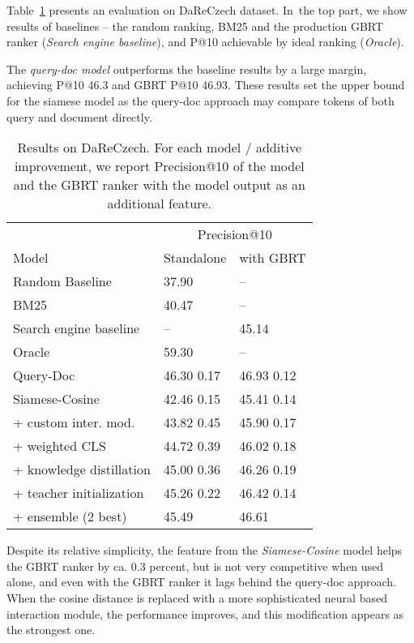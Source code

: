 \documentclass[letterpaper]{article} \usepackage{aaai22 }  \usepackage{times}  \usepackage{helvet}  \usepackage{courier}  \usepackage[hyphens]{url}  \usepackage{graphicx} \usepackage{amsmath,amsfonts,amssymb, mathabx,bm,bbm}
\begin{document}
Table~\ref{table:results_main} presents an evaluation on DaReCzech dataset. In~the top part, we show results of baselines – the random ranking, BM25 and the production GBRT ranker (\textit{Search engine baseline}), and P@10 achievable by ideal ranking (\textit{Oracle}).

The \textit{query-doc model} outperforms the baseline results by a large margin, achieving P@10 46.3 and GBRT P@10 46.93. 
These results set the upper bound for the siamese model as the query-doc approach may compare tokens of both query and document directly.

\begin{table}[!htb]
    \centering\footnotesize
    \begin{tabular}{lll}\toprule
    & \multicolumn{2}{c}{Precision@10}\\
    Model & Standalone & with GBRT \\\midrule
    Random Baseline & 37.90 & -- \\
    BM25 & 40.47 & -- \\
    Search engine baseline & -- & 45.14 \\
    Oracle & 59.30 & -- \\\midrule
    
    Query-Doc & 46.30  0.17 & 46.93  0.12 \\\midrule
    
    Siamese-Cosine & 42.46  0.15	& 45.41  0.14 \\
     + custom inter. mod. & 43.82  0.45 & 45.90  0.17 \\
     + weighted CLS & 44.72  0.39	& 46.02  0.18 \\
     + knowledge distillation & 45.00  0.36 & 46.26  0.19\\
     + teacher initialization & 45.26  0.22 & 46.42  0.14\\
     + ensemble (2 best) & 45.49 & 46.61  \\\bottomrule
    \end{tabular}
    \caption{Results on DaReCzech. For each model / additive improvement, we report Precision@10 of the model and the GBRT ranker with the model output as an additional feature.}
    \label{table:results_main}
\end{table}

Despite its relative simplicity, the feature from the \textit{Siamese-Cosine} model helps the GBRT ranker by ca. 0.3 percent, but is not very competitive when used alone, and even with the GBRT ranker it lags behind the query-doc approach. When the cosine distance is replaced with a more sophisticated neural based interaction module, the performance improves, and this modification appears as the strongest one.
\end{document}
